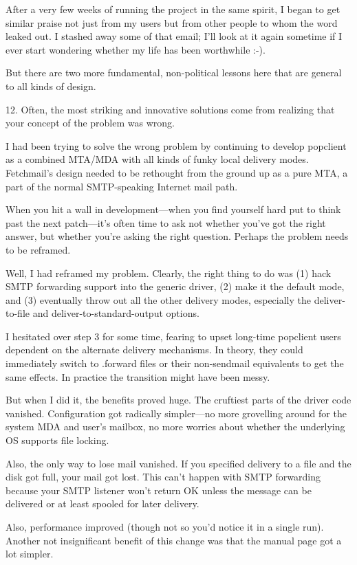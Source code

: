 \documentclass[a4paper,12pt,UTF8,twoside]{ctexbook}
\begin{document}
After a very few weeks of running the project in the same spirit, I began to get similar praise not just from my users but from other people to whom the word leaked out. I stashed away some of that email; I'll look at it again sometime if I ever start wondering whether my life has been worthwhile :-).

But there are two more fundamental, non-political lessons here that are general to all kinds of design.

12. Often, the most striking and innovative solutions come from realizing that your concept of the problem was wrong.

I had been trying to solve the wrong problem by continuing to develop popclient as a combined MTA/MDA with all kinds of funky local delivery modes. Fetchmail's design needed to be rethought from the ground up as a pure MTA, a part of the normal SMTP-speaking Internet mail path.

When you hit a wall in development—when you find yourself hard put to think past the next patch—it's often time to ask not whether you've got the right answer, but whether you're asking the right question. Perhaps the problem needs to be reframed.

Well, I had reframed my problem. Clearly, the right thing to do was (1) hack SMTP forwarding support into the generic driver, (2) make it the default mode, and (3) eventually throw out all the other delivery modes, especially the deliver-to-file and deliver-to-standard-output options.

I hesitated over step 3 for some time, fearing to upset long-time popclient users dependent on the alternate delivery mechanisms. In theory, they could immediately switch to .forward files or their non-sendmail equivalents to get the same effects. In practice the transition might have been messy.

But when I did it, the benefits proved huge. The cruftiest parts of the driver code vanished. Configuration got radically simpler—no more grovelling around for the system MDA and user's mailbox, no more worries about whether the underlying OS supports file locking.

Also, the only way to lose mail vanished. If you specified delivery to a file and the disk got full, your mail got lost. This can't happen with SMTP forwarding because your SMTP listener won't return OK unless the message can be delivered or at least spooled for later delivery.

Also, performance improved (though not so you'd notice it in a single run). Another not insignificant benefit of this change was that the manual page got a lot simpler.
\end{document}
